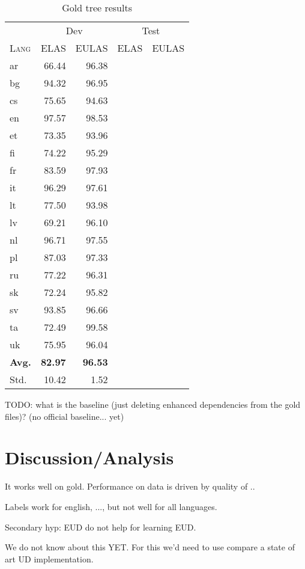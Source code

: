 \documentclass[11pt,a4paper]{article}
\begin{document}
    
\begin{table}[h]
	\centering
	\begin{tabular}{l|rrrr}
        & \multicolumn{2}{c}{Dev} & \multicolumn{2}{c}{Test} \\
		\textsc{Lang} & \textsc{ELAS} & \textsc{EULAS} & \textsc{ELAS} & \textsc{EULAS} \\
		\hline 
		ar & 66.44 & 96.38 & & \\
		bg & 94.32 & 96.95 \\
		cs & 75.65 & 94.63 & & \\
		en & 97.57 & 98.53 & & \\
		et & 73.35 & 93.96 & & \\
		fi & 74.22 & 95.29 & & \\
		fr & 83.59 & 97.93 & & \\
		it & 96.29 & 97.61 & & \\
		lt & 77.50 & 93.98  & & \\
		lv & 69.21 & 96.10 & & \\
		nl & 96.71 & 97.55 & & \\
		pl & 87.03 & 97.33 & & \\
		ru & 77.22 & 96.31 & & \\
		sk & 72.24 & 95.82 \\
		sv & 93.85 & 96.66 \\
		ta & 72.49 & 99.58 \\
		uk & 75.95 & 96.04 \\
		\textbf{Avg.} & \textbf{82.97}  & \textbf{96.53}&& \\
        Std. & 10.42 & 1.52 & & \\
	\end{tabular}
	\caption{Gold tree results}
\end{table} 

TODO: what is the baseline (just deleting enhanced dependencies from the gold files)? (no official baseline... yet)

\section{Discussion/Analysis}


It works well on gold.
Performance on data is driven by quality of ..

Labels work for english, ...,  but not well for all languages.

Secondary hyp: EUD do not help for learning EUD.

We do not know about this YET. For this we'd need to use compare a
state of art UD implementation.
\end{document}
